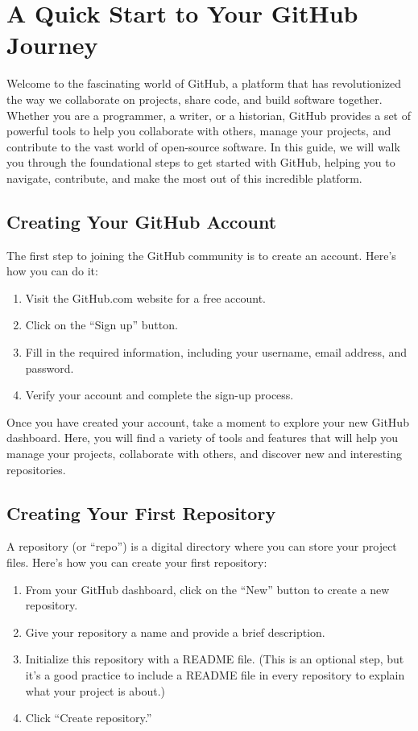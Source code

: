 \documentclass{book}
\begin{document}
\section*{A Quick Start to Your GitHub Journey}

Welcome to the fascinating world of GitHub, a platform that has revolutionized the way we collaborate on projects, share code, and build software together. Whether you are a programmer, a writer, or a historian, GitHub provides a set of powerful tools to help you collaborate with others, manage your projects, and contribute to the vast world of open-source software. In this guide, we will walk you through the foundational steps to get started with GitHub, helping you to navigate, contribute, and make the most out of this incredible platform.

\subsection*{Creating Your GitHub Account}

The first step to joining the GitHub community is to create an account. Here’s how you can do it:

\begin{enumerate}
    \item Visit the GitHub.com website for a free account.
    \item Click on the “Sign up” button.
    \item Fill in the required information, including your username, email address, and password.
    \item Verify your account and complete the sign-up process.
\end{enumerate}

Once you have created your account, take a moment to explore your new GitHub dashboard. Here, you will find a variety of tools and features that will help you manage your projects, collaborate with others, and discover new and interesting repositories.

\subsection*{Creating Your First Repository}

A repository (or “repo”) is a digital directory where you can store your project files. Here’s how you can create your first repository:

\begin{enumerate}
    \item From your GitHub dashboard, click on the “New” button to create a new repository.
    \item Give your repository a name and provide a brief description.
    \item Initialize this repository with a README file. (This is an optional step, but it’s a good practice to include a README file in every repository to explain what your project is about.)
    \item Click “Create repository.”
\end{enumerate}
\end{document}
